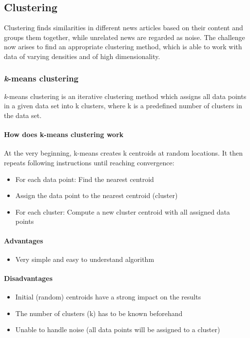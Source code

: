 \subsection{Clustering}
Clustering finds similarities in different news articles based on their content and groups them together,
while unrelated news are regarded as noise.
The challenge now arises to find an appropriate clustering method,
which is able to work with data of varying densities and of high dimensionality.


\subsubsection{\textit{k}-means clustering}
\textit{k}-means clustering is an iterative clustering method which assigns all data points in a given data set
into k clusters, where k is a predefined number of clusters in the data set.

\paragraph{How does k-means clustering work}
At the very beginning, k-means creates k centroids at random locations.
It then repeats following instructions until reaching convergence:

\begin{itemize}
    \item For each data point: Find the nearest centroid
    \item Assign the data point to the nearest centroid (cluster)
    \item For each cluster: Compute a new cluster centroid with all assigned data points
\end{itemize}

\paragraph{Advantages}
\begin{itemize}
    \item Very simple and easy to understand algorithm
\end{itemize}

\paragraph{Disadvantages}
\begin{itemize}
    \item Initial (random) centroids have a strong impact on the results
    \item The number of clusters (k) has to be known beforehand
    \item Unable to handle noise (all data points will be assigned to a cluster)
\end{itemize}

